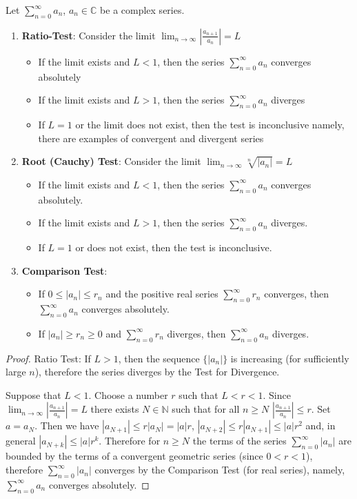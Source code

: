 \documentclass[12pt]{article}
\begin{document}
\begin{proposition}
Let $\sum_{n=0}^\infty a_n$, $a_n \in \mathbb{C}$ be a complex series.
\begin{enumerate}
    \item \textbf{Ratio-Test}: Consider the limit $\lim_{n\to\infty} |\frac{a_{n+1}}{a_n}| = L$
    \begin{itemize}
        \item If the limit exists and $L < 1$, then the series $\sum_{n=0}^\infty a_n$ converges absolutely
        \item If the limit exists and $L > 1$, then the series $\sum_{n=0}^\infty a_n$ diverges
        \item If $L = 1$ or the limit does not exist, then the test is inconclusive {namely, there are examples of convergent and divergent series}
    \end{itemize}
    \item \textbf{Root (Cauchy) Test}: Consider the limit $\lim_{n\to\infty} \sqrt[n]{|a_n|} = L$
        \begin{itemize}
            \item If the limit exists and $L < 1$, then the series $\sum_{n=0}^\infty a_n$ converges absolutely.
            \item If the limit exists and $L > 1$, then the series $\sum_{n=0}^\infty a_n$ diverges.
            \item If $L = 1$ or does not exist, then the test is inconclusive.
        \end{itemize}
    \item \textbf{Comparison Test}:
    \begin{itemize}
        \item If $0 \leq |a_n| \leq r_n$ and the positive real series $\sum_{n=0}^\infty r_n$ converges, then $\sum_{n=0}^\infty a_n$ converges absolutely.
        \item If $|a_n| \geq r_n \geq 0$ and $\sum_{n=0}^\infty r_n$ diverges, then $\sum_{n=0}^\infty a_n$ diverges.
    \end{itemize}
\end{enumerate}
\end{proposition}

\begin{proof}
Ratio Test: If $L > 1$, then the sequence $\{|a_n|\}$ is increasing (for sufficiently large $n$), therefore the series diverges by the Test for Divergence.

Suppose that $L < 1$. Choose a number $r$ such that $L < r < 1$.
Since $\lim_{n\to\infty} |\frac{a_{n+1}}{a_n}| = L$ there exists $N \in \mathbb{N}$ such that for all $n \geq N$ $|\frac{a_{n+1}}{a_n}| \leq r$. Set $a = a_N$. Then we have $|a_{N+1}| \leq r|a_N| = |a|r$,
$|a_{N+2}| \leq r|a_{N+1}| \leq |a|r^2$ and, in general $|a_{N+k}| \leq |a|r^k$. Therefore for $n \geq N$ the terms of the series $\sum_{n=0}^\infty |a_n|$ are bounded by the terms of a convergent geometric series (since $0 < r < 1$), therefore $\sum_{n=0}^\infty |a_n|$ converges by the Comparison Test (for real series), namely, $\sum_{n=0}^\infty a_n$ converges absolutely.
\end{proof}
\end{document}
